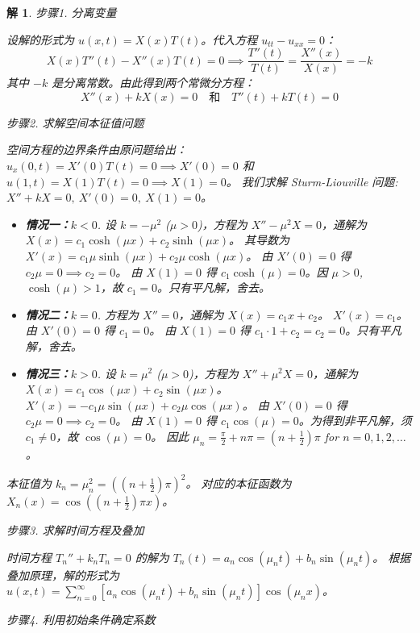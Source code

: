 \documentclass[12pt,a4paper]{article}
\numberwithin{subsection}{section}
\numberwithin{subsubsection}{subsection}
\theoremstyle{plain}
\newtheorem{solution}{解}[subsection]
\theoremstyle{definition}
\theoremstyle{remark}
\begin{document}
	\begin{solution}
		步骤1. 分离变量
		
		\noindent
		设解的形式为 $u(x,t) = X(x)T(t)$。代入方程 $u_{tt} - u_{xx} = 0$：
		\[ X(x)T''(t) - X''(x)T(t) = 0 \implies \frac{T''(t)}{T(t)} = \frac{X''(x)}{X(x)} = -k \]
		其中 $-k$ 是分离常数。由此得到两个常微分方程：
		\[ X''(x) + k X(x) = 0 \quad \text{和} \quad T''(t) + k T(t) = 0 \]
		
		步骤2. 求解空间本征值问题
		
		\noindent
		空间方程的边界条件由原问题给出：$u_x(0,t) = X'(0)T(t)=0 \implies X'(0)=0$ 和 $u(1,t)=X(1)T(t)=0 \implies X(1)=0$。
		我们求解 Sturm-Liouville 问题: $X'' + k X = 0, \ X'(0)=0, \ X(1)=0$。
		
		\begin{itemize}
			\item \textbf{情况一：$k < 0$}.
			设 $k = -\mu^2$ ($\mu>0$)，方程为 $X'' - \mu^2 X = 0$，通解为 $X(x) = c_1 \cosh(\mu x) + c_2 \sinh(\mu x)$。
			其导数为 $X'(x) = c_1\mu\sinh(\mu x) + c_2\mu\cosh(\mu x)$。
			由 $X'(0)=0$ 得 $c_2\mu=0 \implies c_2=0$。
			由 $X(1)=0$ 得 $c_1 \cosh(\mu) = 0$。因 $\mu>0$, $\cosh(\mu) > 1$，故 $c_1=0$。只有平凡解，舍去。
			
			\item \textbf{情况二：$k = 0$}.
			方程为 $X''=0$，通解为 $X(x) = c_1 x + c_2$。
			$X'(x) = c_1$。由 $X'(0)=0$ 得 $c_1=0$。
			由 $X(1)=0$ 得 $c_1 \cdot 1 + c_2 = c_2 = 0$。只有平凡解，舍去。
			
			\item \textbf{情况三：$k > 0$}.
			设 $k = \mu^2$ ($\mu>0$)，方程为 $X'' + \mu^2 X = 0$，通解为 $X(x) = c_1 \cos(\mu x) + c_2 \sin(\mu x)$。
			$X'(x) = -c_1\mu\sin(\mu x) + c_2\mu\cos(\mu x)$。
			由 $X'(0)=0$ 得 $c_2\mu=0 \implies c_2=0$。
			由 $X(1)=0$ 得 $c_1 \cos(\mu) = 0$。为得到非平凡解，须 $c_1 \neq 0$，故 $\cos(\mu)=0$。
			因此 $\mu_n = \frac{\pi}{2} + n\pi = (n+\frac{1}{2})\pi$ for $n=0, 1, 2, \dots$。
		\end{itemize}
		本征值为 $k_n = \mu_n^2 = ((n+\frac{1}{2})\pi)^2$。
		对应的本征函数为 $X_n(x) = \cos\left((n+\frac{1}{2})\pi x\right)$。
		
	步骤3. 求解时间方程及叠加
		
		\noindent
		时间方程 $T_n'' + k_n T_n = 0$ 的解为 $T_n(t) = a_n \cos(\mu_n t) + b_n \sin(\mu_n t)$。
		根据叠加原理，解的形式为 $u(x,t) = \sum_{n=0}^\infty \left[a_n \cos(\mu_n t) + b_n \sin(\mu_n t)\right] \cos(\mu_n x)$。
		
	步骤4. 利用初始条件确定系数
		

\end{solution}
\end{document}
